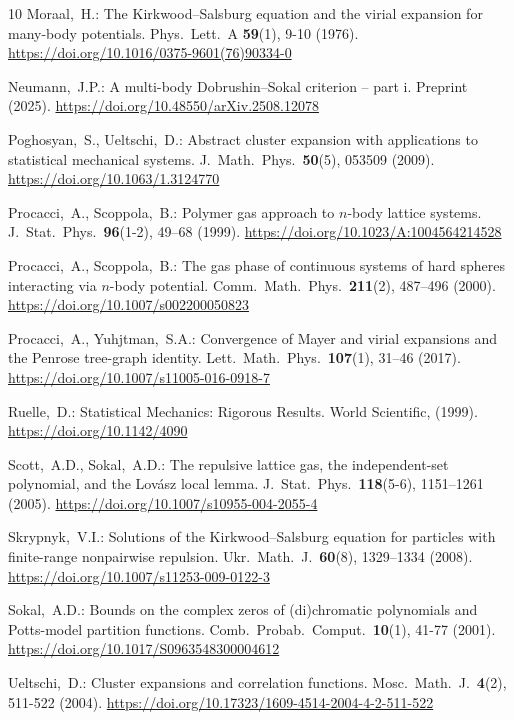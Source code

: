 \documentclass[reqno, 11pt]{amsart}
\theoremstyle{definition}
\begin{document}
\begin{thebibliography}{10}
	 Moraal,~H.: 
	The Kirkwood--Salsburg equation and the virial expansion for many-body potentials. 
	Phys.\ Lett.\ A \textbf{59}(1), 9-10 (1976). 
	\url{https://doi.org/10.1016/0375-9601(76)90334-0}
	
	 Neumann,~J.P.: 
	A multi-body Dobrushin--Sokal criterion -- part i. 
	Preprint (2025). 
	\url{https://doi.org/10.48550/arXiv.2508.12078}
	
	 Poghosyan,~S., Ueltschi,~D.: 
	Abstract cluster expansion with applications to statistical mechanical systems. 
	J.\ Math.\ Phys.\ \textbf{50}(5), 053509 (2009). 
	\url{https://doi.org/10.1063/1.3124770}
	
	 Procacci,~A., Scoppola,~B.: 
	Polymer gas approach to $n$-body lattice systems. 
	J.\ Stat.\ Phys.\ \textbf{96}(1-2), 49–68 (1999). 
	\url{https://doi.org/10.1023/A:1004564214528}
	
	 Procacci,~A., Scoppola,~B.: 
	The gas phase of continuous systems of hard spheres interacting via $n$-body potential. 
	Comm.\ Math.\ Phys.\ \textbf{211}(2), 487–496 (2000). 
	\url{https://doi.org/10.1007/s002200050823}
	
	 Procacci,~A., Yuhjtman,~S.A.: 
	Convergence of Mayer and virial expansions and the Penrose tree-graph identity. 
	Lett.\ Math.\ Phys.\ \textbf{107}(1), 31–46 (2017). 
	\url{https://doi.org/10.1007/s11005-016-0918-7}
	
	 Ruelle,~D.: 
	Statistical Mechanics: Rigorous Results. 
	World Scientific, (1999). 
	\url{https://doi.org/10.1142/4090}
	
	 Scott,~A.D., Sokal,~A.D.: 
	The repulsive lattice gas, the independent-set polynomial, and the Lov{\'a}sz local lemma. 
	J.\ Stat.\ Phys.\ \textbf{118}(5-6), 1151–1261 (2005). 
	\url{https://doi.org/10.1007/s10955-004-2055-4}
	
	 Skrypnyk,~V.I.: 
	Solutions of the Kirkwood--Salsburg equation for particles with finite-range nonpairwise repulsion. 
	Ukr.\ Math.\ J.\ \textbf{60}(8), 1329–1334 (2008). 
	\url{https://doi.org/10.1007/s11253-009-0122-3}
	
	 Sokal,~A.D.: 
	Bounds on the complex zeros of (di)chromatic polynomials and Potts-model partition functions. 
	Comb.\ Probab.\ Comput.\ \textbf{10}(1), 41-77 (2001). 
	\url{https://doi.org/10.1017/S0963548300004612}
	
	 Ueltschi,~D.: 
	Cluster expansions and correlation functions. 
	Mosc.\ Math.\ J.\ \textbf{4}(2), 511-522 (2004). 
	\url{https://doi.org/10.17323/1609-4514-2004-4-2-511-522}
\end{thebibliography}
\end{document}
